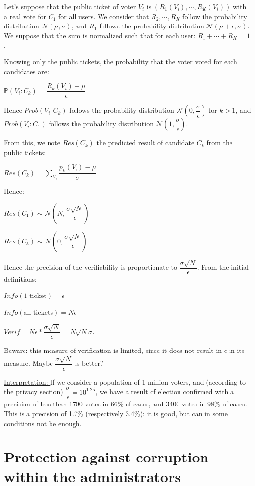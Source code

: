 \documentclass{article}
\newcommand{\Prob}{\mathbb{P}}
\begin{document}
\bigbreak

Let's suppose that the public ticket of voter $V_i$ is $(R_1(V_i), \cdots, R_K(V_i))$ with a real vote for $C_1$ for all users. We consider that $R_2, \cdots, R_K$ follow the probability distribution $\mathcal{N}(\mu ,\sigma)$, and $R_1$ follows the probability distribution $\mathcal{N}(\mu+\epsilon ,\sigma)$. We suppose that the sum is normalized such that for each user: $R_1 + \cdots + R_K=1$.

Knowing only the public tickets, the probability that the voter voted for each candidates are:

$\Prob(V_i: C_k)=\dfrac{R_k(V_i) - \mu}{\epsilon}$

Hence $Prob(V_i: C_k)$ follows the probability distribution $\mathcal{N}(0, \dfrac{\sigma}{\epsilon})$ for $k>1$, and $Prob(V_i: C_1)$ follows the probability distribution $\mathcal{N}(1, \dfrac{\sigma}{\epsilon})$.

From this, we note $Res(C_k)$ the predicted result of candidate $C_k$ from the public tickets:

$Res(C_k)=\sum\limits_{V_i}\dfrac{p_k(V_i)-\mu}{\sigma}$

Hence:

$Res(C_1) \sim \mathcal{N}(N, \dfrac{\sigma \sqrt{N}}{\epsilon})$

$Res(C_k) \sim \mathcal{N}(0, \dfrac{\sigma \sqrt{N}}{\epsilon})$

Hence the precision of the verifiability is proportionate to $\dfrac{\sigma \sqrt{N}}{\epsilon}$. From the initial definitions:

$Info(\text{1 ticket})=\epsilon$

$Info(\text{all tickets})=N \epsilon$

$Verif=N \epsilon * \dfrac{\sigma \sqrt{N}}{\epsilon} = N\sqrt{N} \sigma$.

Beware: this measure of verification is limited, since it does not result in $\epsilon$ in its measure. Maybe $\dfrac{\sigma \sqrt{N}}{\epsilon}$ is better?

\underline{Interpretation: } If we consider a population of 1 million voters, and (according to the privacy section) $\dfrac{\sigma}{\epsilon}=10^{1.25}$, we have a result of election confirmed with a precision of less than 1700 votes in 66\% of cases, and 3400 votes in 98\% of cases. This is a precision of 1.7\% (respectively 3.4\%): it is good, but can in some conditions not be enough.

\section{Protection against corruption within the administrators}
\end{document}

